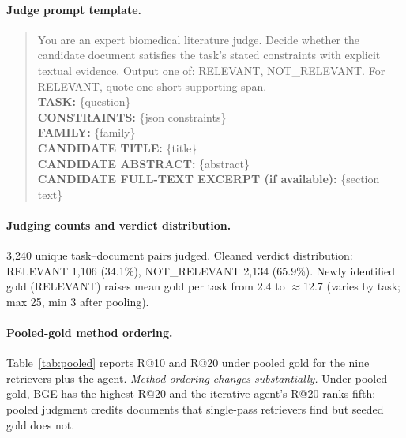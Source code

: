 \documentclass{article}
\begin{document}
\paragraph{Judge prompt template.}
\begin{quote}\small
You are an expert biomedical literature judge. Decide whether the candidate document satisfies the task's stated constraints with explicit textual evidence. Output one of: RELEVANT, NOT\_RELEVANT. For RELEVANT, quote one short supporting span.\\
\textbf{TASK:} \{question\}\\
\textbf{CONSTRAINTS:} \{json constraints\}\\
\textbf{FAMILY:} \{family\}\\
\textbf{CANDIDATE TITLE:} \{title\}\\
\textbf{CANDIDATE ABSTRACT:} \{abstract\}\\
\textbf{CANDIDATE FULL-TEXT EXCERPT (if available):} \{section text\}
\end{quote}

\paragraph{Judging counts and verdict distribution.} 3{,}240 unique task--document pairs judged. Cleaned verdict distribution: RELEVANT 1{,}106 (34.1\%), NOT\_RELEVANT 2{,}134 (65.9\%). Newly identified gold (RELEVANT) raises mean gold per task from 2.4 to $\approx$12.7 (varies by task; max 25, min 3 after pooling).

\paragraph{Pooled-gold method ordering.} Table~\ref{tab:pooled} reports R@10 and R@20 under pooled gold for the nine retrievers plus the agent. \emph{Method ordering changes substantially.} Under pooled gold, BGE has the highest R@20 and the iterative agent's R@20 ranks fifth: pooled judgment credits documents that single-pass retrievers find but seeded gold does not.
\end{document}
